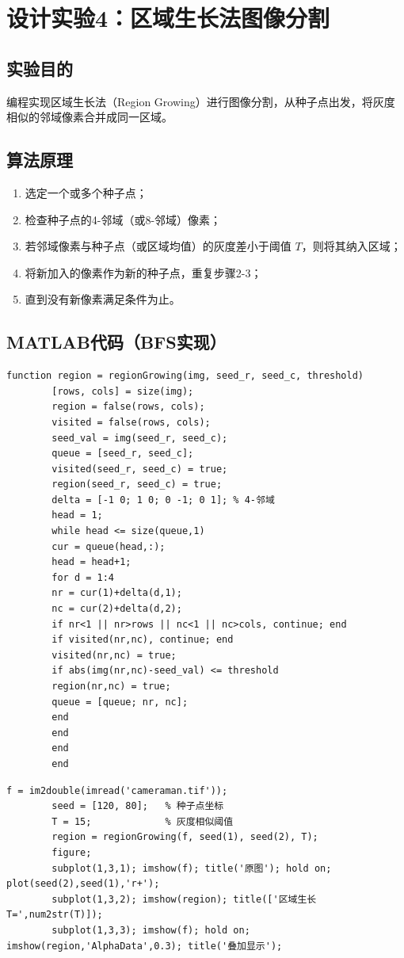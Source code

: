 \documentclass[12pt,a4paper]{article}
\begin{document}
	\section{设计实验4：区域生长法图像分割}
	
	\subsection{实验目的}
	编程实现区域生长法（Region Growing）进行图像分割，从种子点出发，将灰度相似的邻域像素合并成同一区域。
	
	\subsection{算法原理}
	\begin{enumerate}
		\item 选定一个或多个种子点；
		\item 检查种子点的4-邻域（或8-邻域）像素；
		\item 若邻域像素与种子点（或区域均值）的灰度差小于阈值 \(T\)，则将其纳入区域；
		\item 将新加入的像素作为新的种子点，重复步骤2-3；
		\item 直到没有新像素满足条件为止。
	\end{enumerate}
	
	\subsection{MATLAB代码（BFS实现）}
	\begin{lstlisting}[caption=区域生长函数]
		function region = regionGrowing(img, seed_r, seed_c, threshold)
		[rows, cols] = size(img);
		region = false(rows, cols);
		visited = false(rows, cols);
		seed_val = img(seed_r, seed_c);
		queue = [seed_r, seed_c];
		visited(seed_r, seed_c) = true;
		region(seed_r, seed_c) = true;
		delta = [-1 0; 1 0; 0 -1; 0 1]; % 4-邻域
		head = 1;
		while head <= size(queue,1)
		cur = queue(head,:);
		head = head+1;
		for d = 1:4
		nr = cur(1)+delta(d,1);
		nc = cur(2)+delta(d,2);
		if nr<1 || nr>rows || nc<1 || nc>cols, continue; end
		if visited(nr,nc), continue; end
		visited(nr,nc) = true;
		if abs(img(nr,nc)-seed_val) <= threshold
		region(nr,nc) = true;
		queue = [queue; nr, nc];
		end
		end
		end
		end
	\end{lstlisting}
	
	\begin{lstlisting}[caption=主程序调用]
		f = im2double(imread('cameraman.tif'));
		seed = [120, 80];   % 种子点坐标
		T = 15;             % 灰度相似阈值
		region = regionGrowing(f, seed(1), seed(2), T);
		figure;
		subplot(1,3,1); imshow(f); title('原图'); hold on; plot(seed(2),seed(1),'r+');
		subplot(1,3,2); imshow(region); title(['区域生长 T=',num2str(T)]);
		subplot(1,3,3); imshow(f); hold on; imshow(region,'AlphaData',0.3); title('叠加显示');
	\end{lstlisting}
	
\end{document}
